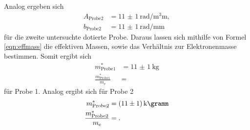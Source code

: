    Analog ergeben sich 
   \begin{align}
    A_\text{Probe2} &= \SI{11(1)}{\radian\per\cubic\milli\meter}, \\
     b_\text{Probe2} &= \SI{11(1)}{\radian\per\milli\meter}
   \end{align} \noindent       
    für die zweite untersuchte dotierte Probe. Daraus lassen sich mithilfe von Formel \ref{eqn:effmass} 
    die effektiven Massen, sowie das Verhältnis zur Elektronenmasse bestimmen. Somit ergibt sich 
    \begin{align}
        m_\text{Probe1}^* &= \SI{11(1)}{\kilo\gram} \\
        \frac{m_\text{Probe1}^*}{m_\text{e}} &= 
    \end{align} \noindent 
    für Probe 1. Analog ergibt sich für Probe 2
    \begin{align}
        m_\text{Probe2}^* &= \SI{11(1)}{\kilo\gramm} \\
        \frac{m_\text{Probe2}^*}{m_\text{e}} &= .
    \end{align} \noindent 
    
